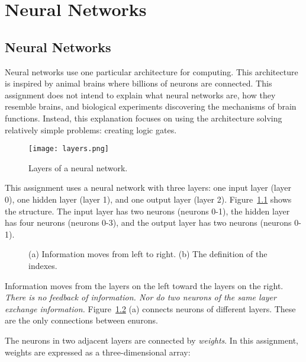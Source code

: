 \chapter{Neural Networks}
\label{chapter:nn}



\tableofcontents


\section{Neural Networks}

Neural networks use one particular architecture for computing.  This
architecture is inspired by animal brains where billions of neurons are connected.
This assignment does not intend to explain what neural networks are,
how they resemble brains, and biological experiments discovering the
mechanisms of brain functions.  Instead, this explanation focuses on
using the architecture solving relatively simple problems: creating
logic gates.

\begin{figure}[h]
\centering
{\texttt{[image: layers.png]}}
\caption{Layers of a neural network.}
  \label{fig:layers}
\end{figure}

This assignment uses a neural network with three layers: one input
layer (layer 0), one hidden layer (layer 1), and one output layer
(layer 2).  Figure~\ref{fig:layers} shows the structure.  The input
layer has two neurons (neurons 0-1), the hidden layer has four neurons
(neurons 0-3), and the output layer has two neurons (neurons 0-1).

\begin{figure}[h]
\centering
{}
\hspace{0.3in}
\caption{(a) Information moves from left to right.
(b) The definition of the indexes.}
  \label{fig:forward}
\end{figure}

Information moves from the layers on the left toward the layers on the
right.  {\it There is no feedback of information.  Nor do two neurons
of the same layer exchange information.  } Figure~\ref{fig:forward}
(a) connects neurons of different layers.  These are the only
connections between enurons.

The neurons in two adjacent layers are connected by {\it weights}.  In
this assignment, weights are expressed as a three-dimensional array:


